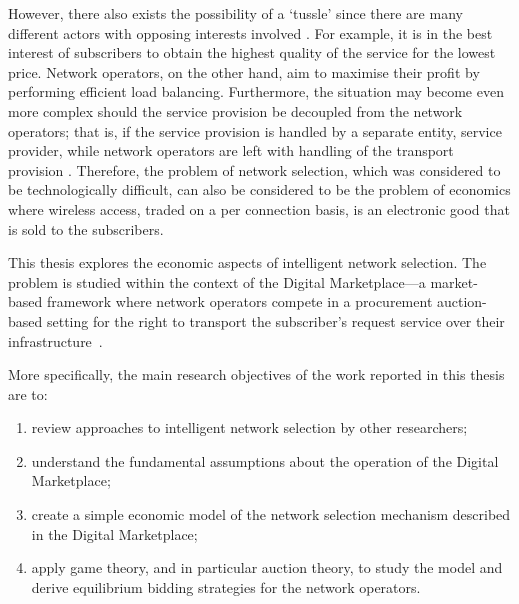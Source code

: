 However, there also exists the possibility of a `tussle' since there are many different actors with opposing interests involved \cite{Clark02}. For example, it is in the best interest of subscribers to obtain the highest quality of the service for the lowest price. Network operators, on the other hand, aim to maximise their profit by performing efficient load balancing. Furthermore, the situation may become even more complex should the service provision be decoupled from the network operators; that is, if the service provision is handled by a separate entity, service provider, while network operators are left with handling of the transport provision \cite{DMBushTussle09}. Therefore, the problem of network selection, which was considered to be technologically difficult, can also be considered to be the problem of economics where wireless access, traded on a per connection basis, is an electronic good that is sold to the subscribers.

This thesis explores the economic aspects of intelligent network selection. The problem is studied within the context of the Digital Marketplace---a market-based framework where network operators compete in a procurement auction-based setting for the right to transport the subscriber's request service over their infrastructure~\cite{DMLeBodic00}.

More specifically, the main research objectives of the work reported in this thesis are to:
\begin{enumerate}
\item review approaches to intelligent network selection by other researchers;
\item understand the fundamental assumptions about the operation of the Digital Marketplace;
\item create a simple economic model of the network selection mechanism described in the Digital Marketplace;
\item apply game theory, and in particular auction theory, to study the model and derive equilibrium bidding strategies for the network operators.
\end{enumerate}

